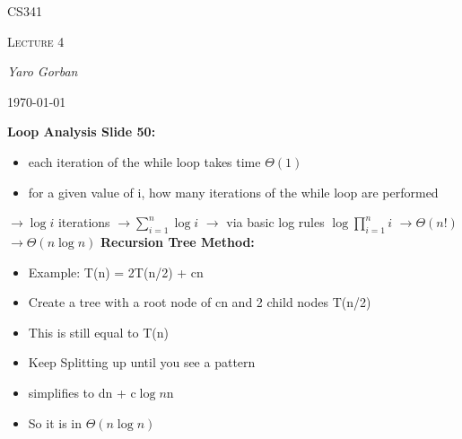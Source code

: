 \documentclass[12pt,a4paper]{report}
\begin{document}
	\centering
	{\scshape\LARGE CS341 \par}
	{\scshape\Large Lecture 4\par}
	{\Large\itshape Yaro Gorban\par}
	{\large \today\par}
	\vspace{1.5cm}
	
	\textbf{Loop Analysis Slide 50:}
	\begin{itemize}
	\item each iteration of the while loop takes time $\Theta(1)$
	\item for a given value of i, how many iterations of the while loop are performed
	\end{itemize}
	 $\rightarrow \log i$ iterations \linebreak
	 $\rightarrow \sum^n_{i=1} \log i$ \linebreak
	 $\rightarrow$ via basic log rules $\log \prod^n_{i=1} i$ \linebreak
	 $\rightarrow \Theta (n!)$ \linebreak
	 $\rightarrow \Theta (n \log n)$ \linebreak
	\textbf{Recursion Tree Method:}
	\begin{itemize}
	\item Example: T(n) = 2T(n/2) + cn
	\item Create a tree with a root node of cn and 2 child nodes T(n/2)
	\end{itemize}
	\begin{center}\end{center}
	\begin{itemize}
	\item This is still equal to T(n)
	\item Keep Splitting up until you see a pattern
	\item simplifies to dn + c$\log n$n
	\item So it is in $\Theta (n\log n)$
	\end{itemize}
\end{document}
